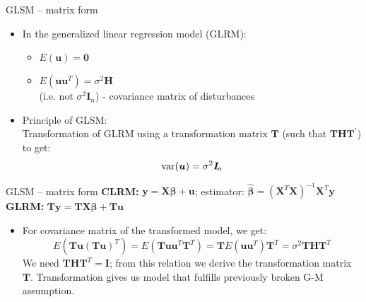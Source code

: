 \documentclass{beamer}
\begin{document}
\begin{frame}{GLSM – matrix form}
\begin{itemize}
\item In the generalized linear regression model (GLRM):
\begin{itemize}
\item $E(\boldsymbol{u})=\boldsymbol{0}$
\item $E(\boldsymbol{uu}^T)=\sigma^2\boldsymbol{H}$ \\ (i.e. not $\sigma^2 \boldsymbol{I}_{\! n}$) - covariance matrix of disturbances
\end{itemize}
\vspace{0.5cm}
\item Principle of GLSM: \\Transformation of GLRM using a transformation matrix $\boldsymbol{T}$ (such that $\bm{THT}^{\prime}$) to get: 
$$\textnormal{var}(\boldsymbol{u}) = \sigma^2 \boldsymbol{I}_{\! n}$$
\end{itemize}
\end{frame}


\begin{frame}{GLSM – matrix form}
\textbf{CLRM:} \hspace{0.2cm} $\boldsymbol{y}=\boldsymbol{X}\boldsymbol{\beta}+\boldsymbol{u}$; estimator: $\boldsymbol{\hat{\beta}}=(\boldsymbol{X}^T\boldsymbol{X})^{-1}\boldsymbol{X}^T\boldsymbol{y}$ \\
\textbf{GLRM:} $\boldsymbol{T}\boldsymbol{y}=\boldsymbol{TX}\boldsymbol{\beta}+\boldsymbol{T}\boldsymbol{u}$\\
\begin{itemize}
\item For covariance matrix of the transformed model, we get:
$$E(\boldsymbol{T}\boldsymbol{u}(\boldsymbol{T}\boldsymbol{u})^T)=
E(\boldsymbol{T}\boldsymbol{u}\boldsymbol{u}^T\boldsymbol{T}^T)=\boldsymbol{T} E(\boldsymbol{u}\boldsymbol{u}^T)\boldsymbol{T}^T=\sigma^2\boldsymbol{THT}^T$$
We need $\boldsymbol{THT}^T \! = \boldsymbol{I}$; from this relation we derive the transformation matrix $\boldsymbol{T}$.
Transformation gives us model that fulfills previously broken G-M assumption.
\end{itemize}
\end{frame}

\end{document}
